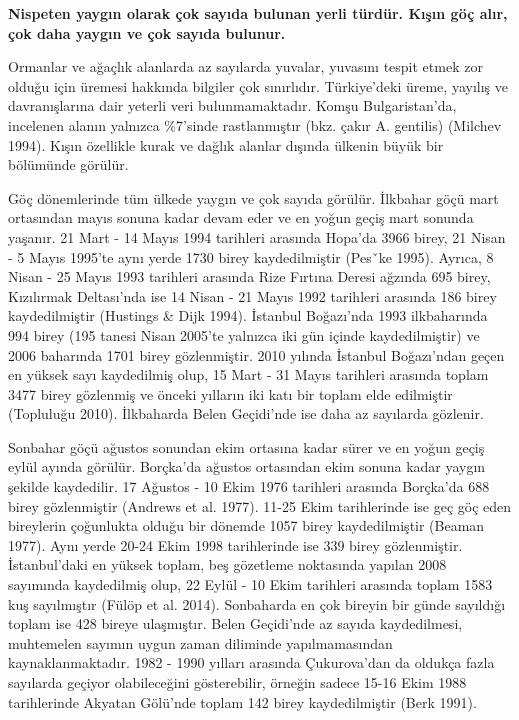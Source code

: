 \documentclass[
  letterpaper,
  DIV=11,
  numbers=noendperiod]{scrreprt}
\begin{document}
\textbf{Nispeten yaygın olarak çok sayıda bulunan yerli türdür. Kışın
göç alır, çok daha yaygın ve çok sayıda bulunur.}

Ormanlar ve ağaçlık alanlarda az sayılarda yuvalar, yuvasını tespit
etmek zor olduğu için üremesi hakkında bilgiler çok sınırlıdır.
Türkiye'deki üreme, yayılış ve davranışlarına dair yeterli veri
bulunmamaktadır. Komşu Bulgaristan'da, incelenen alanın yalnızca
\%7'sinde rastlanmıştır (bkz. çakır A. gentilis) (Milchev 1994). Kışın
özellikle kurak ve dağlık alanlar dışında ülkenin büyük bir bölümünde
görülür.

Göç dönemlerinde tüm ülkede yaygın ve çok sayıda görülür. İlkbahar göçü
mart ortasından mayıs sonuna kadar devam eder ve en yoğun geçiş mart
sonunda yaşanır. 21 Mart - 14 Mayıs 1994 tarihleri arasında Hopa'da 3966
birey, 21 Nisan - 5 Mayıs 1995'te aynı yerde 1730 birey kaydedilmiştir
(Pesˇke 1995). Ayrıca, 8 Nisan - 25 Mayıs 1993 tarihleri arasında Rize
Fırtına Deresi ağzında 695 birey, Kızılırmak Deltası'nda ise 14 Nisan -
21 Mayıs 1992 tarihleri arasında 186 birey kaydedilmiştir (Hustings \&
Dijk 1994). İstanbul Boğazı'nda 1993 ilkbaharında 994 birey (195 tanesi
Nisan 2005'te yalnızca iki gün içinde kaydedilmiştir) ve 2006 baharında
1701 birey gözlenmiştir. 2010 yılında İstanbul Boğazı'ndan geçen en
yüksek sayı kaydedilmiş olup, 15 Mart - 31 Mayıs tarihleri arasında
toplam 3477 birey gözlenmiş ve önceki yılların iki katı bir toplam elde
edilmiştir (Topluluğu 2010). İlkbaharda Belen Geçidi'nde ise daha az
sayılarda gözlenir.

Sonbahar göçü ağustos sonundan ekim ortasına kadar sürer ve en yoğun
geçiş eylül ayında görülür. Borçka'da ağustos ortasından ekim sonuna
kadar yaygın şekilde kaydedilir. 17 Ağustos - 10 Ekim 1976 tarihleri
arasında Borçka'da 688 birey gözlenmiştir (Andrews et al. 1977). 11-25
Ekim tarihlerinde ise geç göç eden bireylerin çoğunlukta olduğu bir
dönemde 1057 birey kaydedilmiştir (Beaman 1977). Aynı yerde 20-24 Ekim
1998 tarihlerinde ise 339 birey gözlenmiştir. İstanbul'daki en yüksek
toplam, beş gözetleme noktasında yapılan 2008 sayımında kaydedilmiş
olup, 22 Eylül - 10 Ekim tarihleri arasında toplam 1583 kuş sayılmıştır
(Fülöp et al. 2014). Sonbaharda en çok bireyin bir günde sayıldığı
toplam ise 428 bireye ulaşmıştır. Belen Geçidi'nde az sayıda
kaydedilmesi, muhtemelen sayımın uygun zaman diliminde yapılmamasından
kaynaklanmaktadır. 1982 - 1990 yılları arasında Çukurova'dan da oldukça
fazla sayılarda geçiyor olabileceğini gösterebilir, örneğin sadece 15-16
Ekim 1988 tarihlerinde Akyatan Gölü'nde toplam 142 birey kaydedilmiştir
(Berk 1991).
\end{document}
